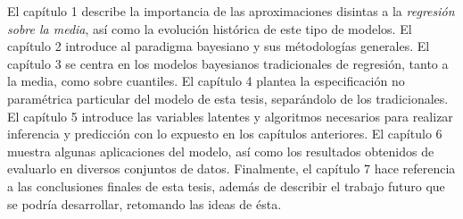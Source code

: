 \documentclass[letterpaper,onside,11pt,review]{report}
\begin{document}
El cap\'itulo 1 describe la importancia de las aproximaciones disintas a la \textit{regresi\'on sobre la media}, así como la evoluci\'on hist\'orica de este tipo de modelos. El cap\'itulo 2 introduce al paradigma bayesiano y sus m\'etodolog\'ias generales. El cap\'itulo 3 se centra en los modelos bayesianos tradicionales de regresi\'on, tanto a la media, como sobre cuantiles. El cap\'itulo 4 plantea la especificaci\'on no param\'etrica particular del modelo de esta tesis, separ\'andolo de los tradicionales. El cap\'itulo 5 introduce las variables latentes y algoritmos necesarios para realizar inferencia y predicci\'on con lo expuesto en los cap\'itulos anteriores. El cap\'itulo 6 muestra algunas aplicaciones del modelo, as\'i como los resultados obtenidos de evaluarlo en diversos conjuntos de datos. Finalmente, el cap\'itulo 7 hace referencia a las conclusiones finales de esta tesis, adem\'as de describir el trabajo futuro que se podr\'ia desarrollar, retomando las ideas de \'esta.


\tableofcontents










%

%

%

\nocite{*} %


%
\end{document}
